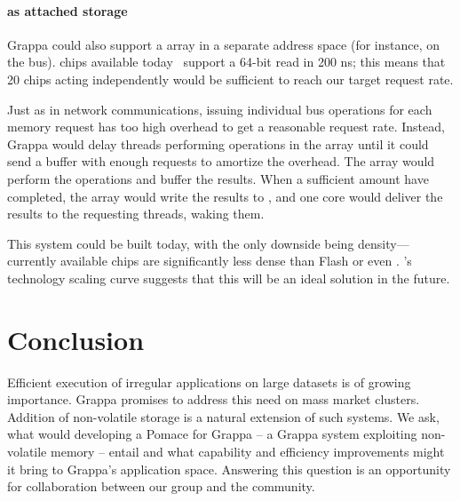 \paragraph{ as attached storage}

Grappa could also support a  array in a separate address space (for
instance, on the  bus).  chips available today~\cite{micronPCM} support a
64-bit read in 200 ns; this means that 20 chips acting independently
would be sufficient to reach our target request rate.

Just as in network communications, issuing individual  bus
operations for each memory request has too high overhead to get a
reasonable request rate.  Instead, Grappa would delay threads
performing operations in the  array until it could send a buffer
with enough requests to amortize the overhead. The  array would
perform the operations and buffer the results. When a sufficient
amount have completed, the  array would write the results to \@,
and one core would deliver the results to the requesting threads,
waking them.


This system could be built today, with the only downside being
density---currently available  chips are significantly less dense
than Flash or even \@. 's technology scaling curve suggests that
this will be an ideal solution in the future.

\section{Conclusion}
Efficient execution of irregular applications on large datasets is of
growing importance.  Grappa promises to address this need on mass
market clusters.  Addition of non-volatile storage is a natural
extension of such systems.  We ask, what would developing a Pomace for
Grappa -- a Grappa system exploiting non-volatile memory -- entail and
what capability and efficiency improvements might it bring to Grappa's
application space.  Answering this question is an opportunity for
collaboration between our group and the  community.












